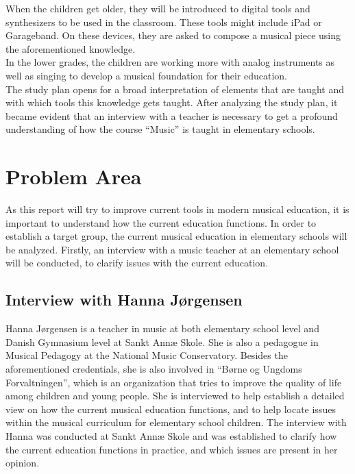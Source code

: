 When the children get older, they will be introduced to digital tools and synthesizers to be used in the classroom. These tools might include iPad or Garageband. On these devices, they are asked to compose a musical piece using the aforementioned knowledge.\\
In the lower grades, the children are working more with analog instruments as well as singing to develop a musical foundation for their education.
\\

The study plan opens for a broad interpretation of elements that are taught and with which tools this knowledge gets taught. After analyzing the study plan, it became evident that an interview with a teacher is necessary to get a profound understanding of how the course “Music” is taught in elementary schools.\\

\section{Problem Area}
As this report will try to improve current tools in modern musical education, it is important to understand how the current education functions. In order to establish a target group, the current musical education in elementary schools will be analyzed. Firstly, an interview with a music teacher at an elementary school will be conducted, to clarify issues with the current education. \\	



\subsection{Interview with Hanna Jørgensen}
Hanna Jørgensen is a teacher in music at both elementary school level and Danish Gymnasium level at Sankt Annæ Skole. She is also a pedagogue in Musical Pedagogy at the National Music Conservatory. Besides the aforementioned credentials, she is also involved in “Børne og Ungdoms Forvaltningen”, which is an organization that tries to improve the quality of life among children and young people. She is interviewed to help establish a detailed view on how the current musical education functions, and to help locate issues within the musical curriculum for elementary school children.
The interview with Hanna was conducted at Sankt Annæ Skole and was established to clarify how the current education functions in practice, and which issues are present in her opinion.\\

